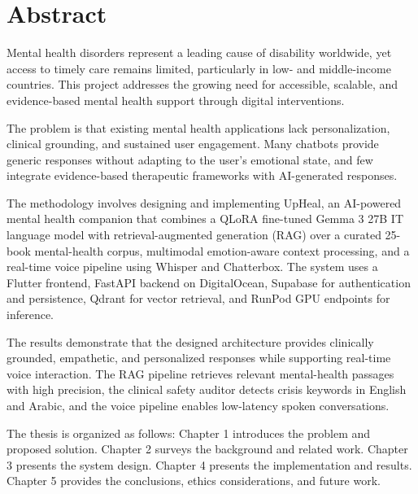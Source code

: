 \documentclass[
  letterpaper,
  12pt,
  a4paper,
  openany]{report}
\renewcommand*\contentsname{Table of contents}
\newcommand\contentsname{Table of contents}
\begin{document}
\renewcommand*\contentsname{Table of contents}
{
\setcounter{tocdepth}{2}
\tableofcontents
}


\chapter*{Abstract}\label{abstract}


Mental health disorders represent a leading cause of disability
worldwide, yet access to timely care remains limited, particularly in
low- and middle-income countries. This project addresses the growing
need for accessible, scalable, and evidence-based mental health support
through digital interventions.

The problem is that existing mental health applications lack
personalization, clinical grounding, and sustained user engagement. Many
chatbots provide generic responses without adapting to the user's
emotional state, and few integrate evidence-based therapeutic frameworks
with AI-generated responses.

The methodology involves designing and implementing UpHeal, an
AI-powered mental health companion that combines a QLoRA fine-tuned
Gemma 3 27B IT language model with retrieval-augmented generation (RAG)
over a curated 25-book mental-health corpus, multimodal emotion-aware
context processing, and a real-time voice pipeline using Whisper and
Chatterbox. The system uses a Flutter frontend, FastAPI backend on
DigitalOcean, Supabase for authentication and persistence, Qdrant for
vector retrieval, and RunPod GPU endpoints for inference.

The results demonstrate that the designed architecture provides
clinically grounded, empathetic, and personalized responses while
supporting real-time voice interaction. The RAG pipeline retrieves
relevant mental-health passages with high precision, the clinical safety
auditor detects crisis keywords in English and Arabic, and the voice
pipeline enables low-latency spoken conversations.

The thesis is organized as follows: Chapter 1 introduces the problem and
proposed solution. Chapter 2 surveys the background and related work.
Chapter 3 presents the system design. Chapter 4 presents the
implementation and results. Chapter 5 provides the conclusions, ethics
considerations, and future work.
\end{document}
